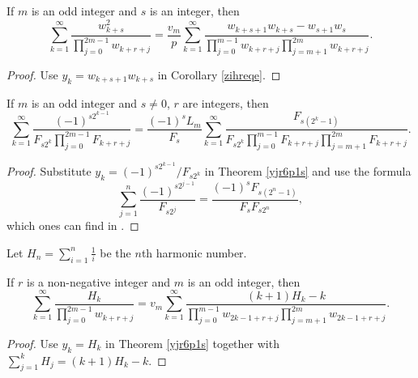 \documentclass[12pt,reqno]{article}
\begin{document}
\begin{proposition}
	If $m$ is an odd integer and $s$ is an integer, then
		\begin{equation*}
		\sum_{k = 1}^\infty  \frac{{w_{k + s}^2 }}{\prod\limits_{j = 0}^{2m - 1} w_{k + r + j}}  =\frac{v_m}{p}  \sum_{k = 1}^\infty\frac{{ {w_{k + s + 1} w_{k + s}  - w_{s + 1} w_s } }}{\prod\limits_{j = 0}^{m - 1} {w_{k + r + j} } \prod\limits_{j = m + 1}^{2m} {w_{k + r + j} }}.
		\end{equation*}
\end{proposition}
\begin{proof}
	Use $y_k=w_{k+s+1}w_{k+s}$ in Corollary \ref{zihreqe}.
\end{proof}
\begin{proposition}
	If $m$ is an odd integer and $s\ne0$, $r$ are integers, then
	\begin{equation*}
		\sum_{k = 1}^\infty  \frac{(-1)^{s2^{k-1}}}{F_{s2^k}\prod\limits_{j = 0}^{2m - 1} F_{k + r + j}}  = \frac{(-1)^sL_m}{F_s}  \sum_{k = 1}^\infty \frac{{ F_{s(2^k-1)}}}{F_{s2^k}\prod\limits_{j = 0}^{m - 1} {F_{k + r + j} } \prod\limits_{j = m + 1}^{2m} {F_{k + r + j} }}.
		\end{equation*}
\end{proposition}
\begin{proof}
	Substitute  $y_k={(-1)^{s2^{k-1}}}/F_{s2^k}$ in Theorem \ref{yjr6p1s} and use the formula 
		\begin{equation*}
		\sum_{j=1}^{n}\frac{(-1)^{s2^{j-1}}}{F_{s2^j}} = \frac{(-1)^sF_{s(2^n-1)}}{F_sF_{s2^n}},
		\end{equation*}
	which ones can find in \cite[Eq. (89)]{Vajda}.
\end{proof}

Let $H_n=\sum\limits_{i=1}^{n}\frac{1}{i}$ be the $n$th harmonic number.
\begin{proposition}
	If $r$ is a non-negative integer and $m$ is an odd integer, then
		\begin{equation*}
		\sum_{k = 1}^\infty  \frac{{H_k }}{{\prod\limits_{j = 0}^{2m - 1} {w_{k + r + j} } }}  = v_m \sum_{k = 1}^\infty  \frac{(k + 1 )H_k  - k}{\prod\limits_{j = 0}^{m - 1} {w_{2k - 1 + r + j}} \prod\limits_{j = m + 1}^{2m} {w_{2k - 1 + r + j} } } .
		\end{equation*}
\end{proposition}
\begin{proof}
	Use $y_k=H_k$ in Theorem \ref{yjr6p1s} together with
	$\sum_{j=1}^kH_j=(k+1)H_k-k$.
\end{proof}
\end{document}
